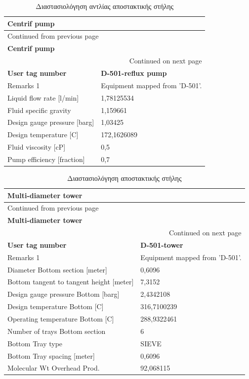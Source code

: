 \documentclass[11pt]{article}
\begin{document}
\begin{longtable}{ll}
\caption{Διαστασιολόγηση αντλίας αποστακτικής στήλης}
\\
\textbf{Centrif pump} & \\
\hline
\endfirsthead
\multicolumn{2}{l}{Continued from previous page} \\
\hline

\textbf{Centrif pump} &  \\

\hline
\endhead
\hline\multicolumn{2}{r}{Continued on next page} \\
\endfoot
\endlastfoot
\hline
\textbf{User tag number} & \textbf{D-501-reflux pump}\\
Remarks 1 & Equipment mapped from 'D-501'.\\
Liquid flow rate [l/min] & 1,78125534\\
Fluid specific gravity & 1,159661\\
Design gauge pressure [barg] & 1,03425\\
Design temperature [C] & 172,1626089\\
Fluid viscosity [cP] & 0,5\\
Pump efficiency [fraction] & 0,7\\
\end{longtable}


\begin{longtable}{ll}
\caption{Διαστασιολόγηση αποστακτικής στήλης}
\\
\textbf{Multi-diameter tower} & \\
\hline
\endfirsthead
\multicolumn{2}{l}{Continued from previous page} \\
\hline

\textbf{Multi-diameter tower} &  \\

\hline
\endhead
\hline\multicolumn{2}{r}{Continued on next page} \\
\endfoot
\endlastfoot
\hline
\textbf{User tag number} & \textbf{D-501-tower}\\
Remarks 1 & Equipment mapped from 'D-501'.\\
Diameter Bottom section [meter] & 0,6096\\
Bottom tangent to tangent height [meter] & 7,3152\\
Design gauge pressure Bottom [barg] & 2,4342108\\
Design temperature Bottom [C] & 316,7100239\\
Operating temperature Bottom [C] & 288,9322461\\
Number of trays Bottom section & 6\\
Bottom Tray type & SIEVE\\
Bottom Tray spacing [meter] & 0,6096\\
Molecular Wt Overhead Prod. & 92,068115\\
\end{longtable}
\end{document}
